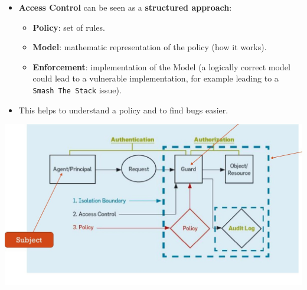 \documentclass[9pt, letterpaper]{article}
\begin{document}
\begin{itemize}
	\item \textbf{Access Control} can be seen as a \textbf{structured approach}:
	\begin{itemize}
		\item \textbf{Policy}: set of rules.
		\item \textbf{Model}: mathematic representation of the policy (how it works).
		\item \textbf{Enforcement}: implementation of the Model (a logically correct model could lead to a vulnerable implementation, for example leading to a {\tt Smash The Stack} issue).
	\end{itemize}
	\item This helps to understand a policy and to find bugs easier.
\end{itemize}
\includegraphics[scale=0.5]{AccessControl.jpg}
\end{document}
